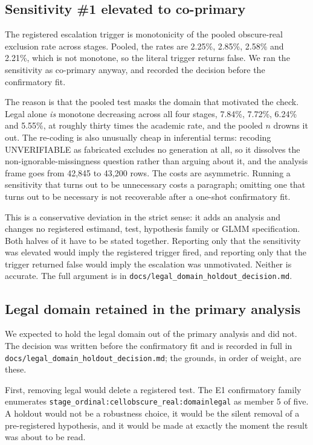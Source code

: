 \subsection{Sensitivity \#1 elevated to co-primary}

The registered escalation trigger is monotonicity of the pooled obscure-real
exclusion rate across stages. Pooled, the rates are 2.25\%, 2.85\%, 2.58\% and
2.21\%, which is not monotone, so the literal trigger returns false. We ran the
sensitivity as co-primary anyway, and recorded the decision before the
confirmatory fit.

The reason is that the pooled test masks the domain that motivated the check.
Legal alone \emph{is} monotone decreasing across all four stages, 7.84\%,
7.72\%, 6.24\% and 5.55\%, at roughly thirty times the academic rate, and the
pooled $n$ drowns it out. The re-coding is also unusually cheap in inferential
terms: recoding UNVERIFIABLE as fabricated excludes no generation at all, so it
dissolves the non-ignorable-missingness question rather than arguing about it,
and the analysis frame goes from 42,845 to 43,200 rows. The costs are
asymmetric. Running a sensitivity that turns out to be unnecessary costs a
paragraph; omitting one that turns out to be necessary is not recoverable after
a one-shot confirmatory fit.

This is a conservative deviation in the strict sense: it adds an analysis and
changes no registered estimand, test, hypothesis family or GLMM specification.
Both halves of it have to be stated together. Reporting only that the
sensitivity was elevated would imply the registered trigger fired, and reporting
only that the trigger returned false would imply the escalation was unmotivated.
Neither is accurate. The full argument is in
\texttt{docs/legal\_domain\_holdout\_decision.md}.

\subsection{Legal domain retained in the primary analysis}

We expected to hold the legal domain out of the primary analysis and did not.
The decision was written before the confirmatory fit and is recorded in full in
\texttt{docs/legal\_domain\_holdout\_decision.md}; the grounds, in order of
weight, are these.

First, removing legal would delete a registered test. The E1 confirmatory family
enumerates \texttt{stage\_ordinal:cellobscure\_real:domainlegal} as member 5 of
five. A holdout would not be a robustness choice, it would be the silent removal
of a pre-registered hypothesis, and it would be made at exactly the moment the
result was about to be read.

